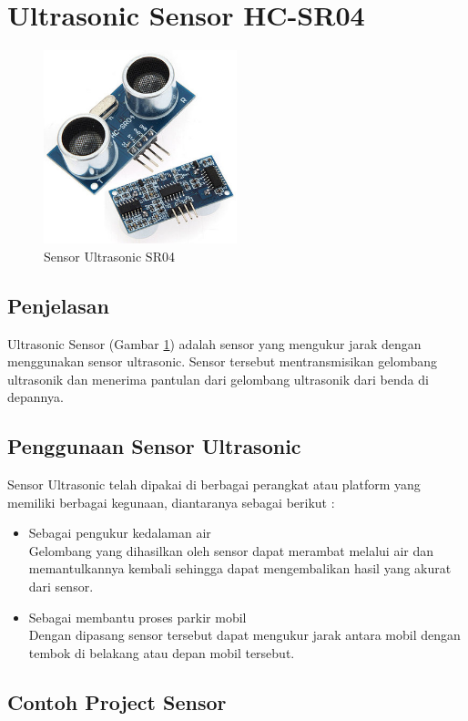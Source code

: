 \section{Ultrasonic Sensor HC-SR04}
\begin{figure}[ht]
\centerline{\includegraphics[width=0.5\textwidth]{figures/sensor.jpg}}
\caption{Sensor Ultrasonic SR04}
\label{sensor}
\end{figure}
\subsection{Penjelasan}
Ultrasonic Sensor (Gambar \ref{sensor}) adalah sensor yang mengukur jarak dengan menggunakan sensor ultrasonic. Sensor tersebut mentransmisikan gelombang ultrasonik dan menerima pantulan dari gelombang ultrasonik dari benda di depannya. 
\subsection{Penggunaan Sensor Ultrasonic}
Sensor Ultrasonic telah dipakai di berbagai perangkat atau platform yang memiliki berbagai kegunaan, diantaranya sebagai berikut : 
\begin{itemize}
	\item Sebagai pengukur kedalaman air \\ Gelombang yang dihasilkan oleh sensor dapat merambat melalui air dan memantulkannya kembali sehingga dapat mengembalikan hasil yang akurat dari sensor.
	\item Sebagai membantu proses parkir mobil \\  Dengan dipasang sensor tersebut dapat mengukur jarak antara mobil dengan tembok di belakang atau depan mobil tersebut.
\end{itemize}
\subsection{Contoh Project Sensor}
